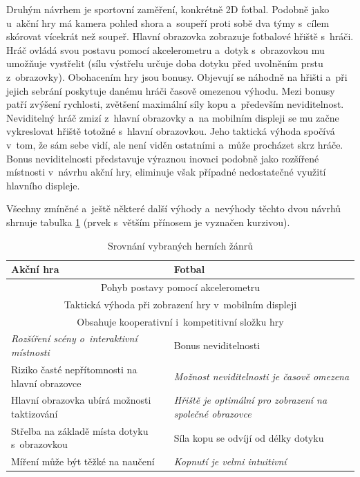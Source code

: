\documentclass[thesis=B,czech,hidelinks]{FITthesis}[2012/06/26] %
\begin{document}
Druhým návrhem je sportovní zaměření, konkrétně 2D fotbal. Podobně jako u~akční hry má kamera pohled shora a~soupeří proti sobě dva týmy s~cílem skórovat vícekrát než soupeř. Hlavní obrazovka zobrazuje fotbalové hřiště s~hráči. Hráč ovládá svou postavu pomocí akcelerometru a~dotyk s~obrazovkou mu umožňuje vystřelit (sílu výstřelu určuje doba dotyku před uvolněním prstu z~obrazovky). Obohacením hry jsou bonusy. Objevují se náhodně na hřišti a~při jejich sebrání poskytuje danému hráči časově omezenou výhodu. Mezi bonusy patří zvýšení rychlosti, zvětšení maximální síly kopu a~především neviditelnost. Neviditelný hráč zmizí z~hlavní obrazovky a~na mobilním displeji se mu začne vykreslovat hřiště totožné s~hlavní obrazovkou. Jeho taktická výhoda spočívá v~tom, že sám sebe vidí, ale není viděn ostatními a~může procházet skrz hráče. Bonus neviditelnosti představuje výraznou inovaci podobně jako rozšířené místnosti v~návrhu akční hry, eliminuje však případné nedostatečné využití hlavního displeje.

Všechny zmíněné a~ještě některé další výhody a~nevýhody těchto dvou návrhů shrnuje tabulka \ref{table:game_comparison} (prvek s~větším přínosem je vyznačen kurzivou).

\begin{table}[h]
\caption{Srovnání vybraných herních žánrů}
\label{table:game_comparison}
\begin{tabularx}{\textwidth}{|X|X|}
\hline
\textbf{Akční hra} & \textbf{Fotbal} \\ \hline
\multicolumn{2}{|c|}{Pohyb postavy pomocí akcelerometru}\\ \hline
\multicolumn{2}{|c|}{Taktická výhoda při zobrazení hry v~mobilním displeji}\\ \hline
\multicolumn{2}{|c|}{Obsahuje kooperativní i~kompetitivní složku hry}\\ \hline
\emph{Rozšíření scény o~interaktivní místnosti} & Bonus neviditelnosti \\ \hline
Riziko časté nepřítomnosti na hlavní obrazovce & \emph{Možnost neviditelnosti je časově omezena} \\ \hline
Hlavní obrazovka ubírá možnosti taktizování & \emph{Hřiště je optimální pro zobrazení na společné obrazovce} \\ \hline

Střelba na základě místa dotyku s~obrazovkou & Síla kopu se odvíjí od délky dotyku \\ \hline
Míření může být těžké na naučení & \emph{Kopnutí je velmi intuitivní} \\ \hline
\end{tabularx}
\end{table}
\end{document}
